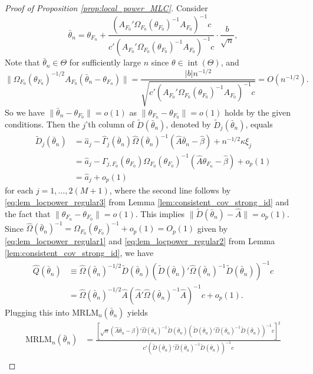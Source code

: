 \documentclass[11pt]{article}
\theoremstyle{definition}
\newcommand{\0}{\ensuremath{\mathbf{0}}}
\begin{document}
\begin{bibunit}
\begin{proof}[Proof of Proposition \ref{prop:local_power_MLC}]
    Consider 
    \[
        \bar{\theta}_n = \theta_{F_n} + \frac{(A_{F_0}'\Omega_{F_0}(\theta_{F_0})^{-1} A_{F_0})^{-1} c}{c'(A_{F_0}'\Omega_{F_0}(\theta_{F_0})^{-1} A_{F_0})^{-1} c} \cdot \frac{b}{\sqrt{n}},
    \]
    Note that $\bar{\theta}_n \in \Theta$ for sufficiently large $n$ since $\theta \in \operatorname{int}(\Theta)$, and 
    \[
        \|\Omega_{F_0}(\theta_{F_0})^{-1/2}A_{F_0}(\bar{\theta}_n - \theta_{F_n})\| = \frac{|b|n^{-1/2}}{\sqrt{c'(A_{F_0}'\Omega_{F_0}(\theta_{F_0})^{-1} A_{F_0})^{-1} c}} = O(n^{-1/2}).
    \]
    So we have $\|\bar{\theta}_n - \theta_{F_0}\| = o(1)$ as $\|\theta_{F_n} - \theta_{F_0}\| = o(1)$ holds by the given conditions. Then the $j$'th column of $\widetilde{D}(\bar{\theta}_n)$, denoted by $\widetilde{D}_j(\bar{\theta}_n)$, equals
    \begin{align*}
        \widetilde{D}_j(\bar{\theta}_n) 
        &= \hat{a}_j - \hat{\Gamma}_j(\bar{\theta}_n) \hat{\Omega} (\bar{\theta}_n)^{-1}(\hat{A}\bar{\theta}_n - \hat{\beta}) + n^{-1/2}\kappa\xi_j\\
        &= \hat{a}_j - {\Gamma}_{j,F_0}(\theta_{F_0}) {\Omega}_{F_0}(\theta_{F_0})^{-1}(\hat{A}\theta_{F_n} - \hat{\beta}) + o_p(1) \\
        &= \hat{a}_j + o_p(1)
    \end{align*}
     for each $j = 1,\ldots,2(M+1)$, where the second line follows by \eqref{eq:lem_locpower_regular3} from Lemma \ref{lem:consistent_cov_strong_id} and the fact that $\|\theta_{F_n} - \theta_{F_0}\| = o(1)$. This implies $\|\widetilde{D}(\bar{\theta}_n) - \hat{A}\| = o_p(1)$. Since $\hat{\Omega}(\bar{\theta}_n)^{-1} = \Omega_{F_0}(\theta_{F_0})^{-1} + o_p(1) = O_p(1)$ given by \eqref{eq:lem_locpower_regular1} and \eqref{eq:lem_locpower_regular2} from Lemma \ref{lem:consistent_cov_strong_id}, we have
     \begin{align*}
        \hat{Q}(\bar{\theta}_n) 
        &\equiv \hat{\Omega}(\bar{\theta}_n)^{-1/2}\widetilde{D}(\bar{\theta}_n)(\widetilde{D}(\bar{\theta}_n)'\hat{\Omega}(\bar{\theta}_n)^{-1}\widetilde{D}(\bar{\theta}_n))^{-1}c \\
        &= \hat{\Omega}(\bar{\theta}_n)^{-1/2}\hat{A}(\hat{A}'\hat{\Omega}(\bar{\theta}_n)^{-1}\hat{A})^{-1}c + o_p(1).
     \end{align*} %
    Plugging this into $\text{MRLM}_n(\bar{\theta}_n)$ yields
    \begin{equation}
    \label{eq:MRLM_local_asymtotic}
    \begin{aligned}
        \text{MRLM}_n(\bar{\theta}_n) 
        &= \frac{\left[\sqrt{n}(\hat{A}\bar{\theta}_n - \hat{\beta})'\hat{\Omega}(\bar{\theta}_n)^{-1}\widetilde{D}(\bar{\theta}_n)\left(\widetilde{D}(\bar{\theta}_n)'\hat{\Omega}(\bar{\theta}_n)^{-1}\widetilde{D}(\bar{\theta}_n)\right)^{-1}c\right]^2}{c'\left(\widetilde{D}(\bar{\theta}_n)'\hat{\Omega}(\bar{\theta}_n)^{-1}\widetilde{D}(\bar{\theta}_n)\right)^{-1}c} \\

\end{aligned}
\end{equation}
\end{proof}
\end{bibunit}
\end{document}
